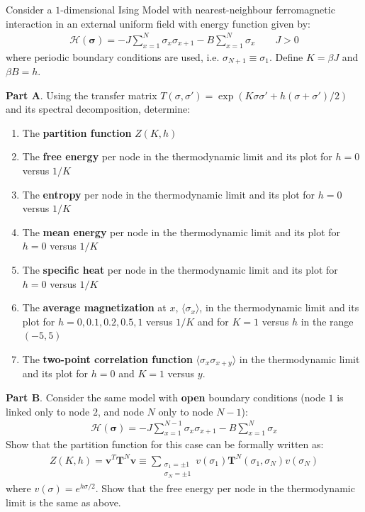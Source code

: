 \documentclass[../template.tex]{subfiles}
\begin{document}
\begin{exo}
    Consider a $1$-dimensional Ising Model with nearest-neighbour ferromagnetic interaction in an external uniform field with energy function given by:
    \begin{align*}
        \mathcal{H}(\bm{\sigma}) = -J \sum_{x=1}^N \sigma_x \sigma_{x+1} - B \sum_{x=1}^N \sigma_x \qquad J > 0
    \end{align*}    
    where periodic boundary conditions are used, i.e. $\sigma_{N+1} \equiv \sigma_1$. Define $K = \beta J$ and $\beta B = h$.
    
    \medskip
    
    \textbf{Part A}. Using the transfer matrix $T(\sigma, \sigma') = \exp(K \sigma \sigma' + h (\sigma + \sigma')/2)$ and its spectral decomposition, determine:
    \begin{enumerate}
        \item The \textbf{partition function} $Z(K,h)$
        \item The \textbf{free energy} per node in the thermodynamic limit and its plot for $h=0$ versus $1/K$
        \item The \textbf{entropy} per node in the thermodynamic limit and its plot for $h=0$ versus $1/K$
        \item The \textbf{mean energy} per node in the thermodynamic limit and its plot for $h=0$ versus $1/K$
        \item The \textbf{specific heat} per node in the thermodynamic limit and its plot for $h=0$ versus $1/K$
        \item The \textbf{average magnetization} at $x$, $\langle \sigma_x \rangle$, in the thermodynamic limit and its plot for $h=0, 0.1, 0.2, 0.5, 1$ versus $1/K$ and for $K=1$ versus $h$ in the range $(-5,5)$
        \item The \textbf{two-point correlation function} $\langle \sigma_x \sigma_{x+y} \rangle$ in the thermodynamic limit and its plot for $h=0$ and $K=1$ versus $y$.
    \end{enumerate}

    \textbf{Part B}. Consider the same model with \textbf{open} boundary conditions (node $1$ is linked only to node $2$, and node $N$ only to node $N-1$):
    \begin{align*}
        \mathcal{H}(\bm{\sigma}) = -J \sum_{x=1}^{N-1} \sigma_x \sigma_{x+1} - B \sum_{x=1}^N \sigma_x
    \end{align*}   
    Show that the partition function for this case can be formally written as:
    \begin{align*}
        Z(K,h) = \bm{v}^T \textbf{T}^N \bm{v} \equiv \sum_{\substack{\sigma_1 = \pm 1\\ \sigma_N = \pm 1}} v(\sigma_1) \textbf{T}^N(\sigma_1, \sigma_N) v(\sigma_N)  
    \end{align*}
    where $v(\sigma) = e^{h \sigma /2}$. Show that the free energy per node in the thermodynamic limit is the same as above.
    

\end{exo}
\end{document}
